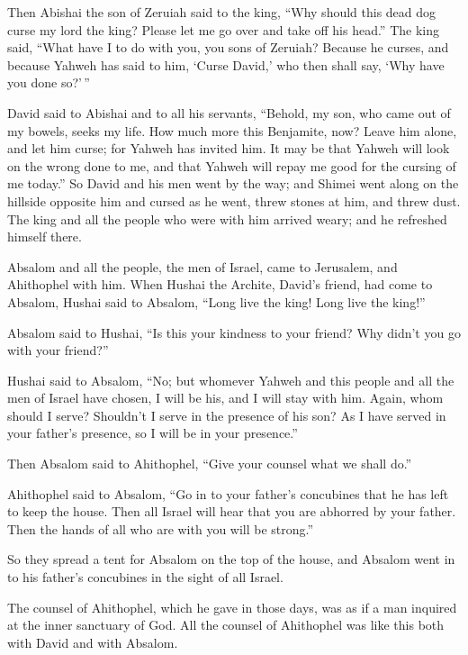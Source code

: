 \begin{paracol}{2}
\begin{otherlanguage}{english}
 Then Abishai the son of Zeruiah said to the king, ``Why
should this dead dog curse my lord the king? Please let me go over and
take off his head.''  The king said, ``What have I to do
with you, you sons of Zeruiah? Because he curses, and because Yahweh has
said to him, `Curse David,' who then shall say, `Why have you done
so?'\,''

 David said to Abishai and to all his servants, ``Behold,
my son, who came out of my bowels, seeks my life. How much more this
Benjamite, now? Leave him alone, and let him curse; for Yahweh has
invited him.  It may be that Yahweh will look on the
wrong done to me, and that Yahweh will repay me good for the cursing of
me today.''  So David and his men went by the way; and
Shimei went along on the hillside opposite him and cursed as he went,
threw stones at him, and threw dust.  The king and all
the people who were with him arrived weary; and he refreshed himself
there.

 Absalom and all the people, the men of Israel, came to
Jerusalem, and Ahithophel with him.  When Hushai the
Archite, David's friend, had come to Absalom, Hushai said to Absalom,
``Long live the king! Long live the king!''

 Absalom said to Hushai, ``Is this your kindness to your
friend? Why didn't you go with your friend?''

 Hushai said to Absalom, ``No; but whomever Yahweh and
this people and all the men of Israel have chosen, I will be his, and I
will stay with him.  Again, whom should I serve?
Shouldn't I serve in the presence of his son? As I have served in your
father's presence, so I will be in your presence.''

 Then Absalom said to Ahithophel, ``Give your counsel
what we shall do.''

 Ahithophel said to Absalom, ``Go in to your father's
concubines that he has left to keep the house. Then all Israel will hear
that you are abhorred by your father. Then the hands of all who are with
you will be strong.''

 So they spread a tent for Absalom on the top of the
house, and Absalom went in to his father's concubines in the sight of
all Israel.

 The counsel of Ahithophel, which he gave in those days,
was as if a man inquired at the inner sanctuary of God. All the counsel
of Ahithophel was like this both with David and with Absalom.


\end{otherlanguage}
\end{paracol}
